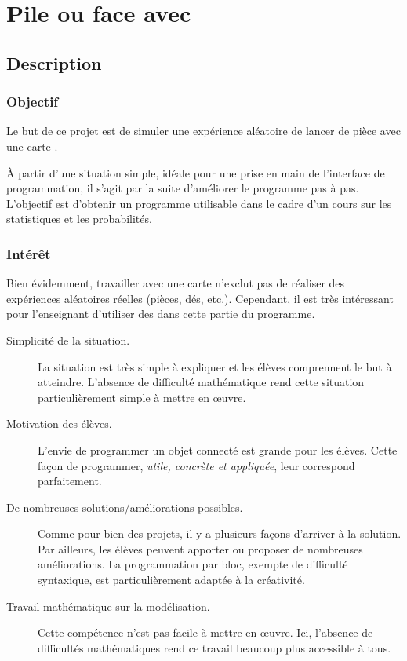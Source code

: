 \section{Pile ou face avec \mb}


\pagestyle{mb}

\subsection{Description}

\subsubsection{Objectif}

\begin{formule}
Le but de ce projet est de simuler une expérience aléatoire de lancer de pièce avec une carte \mb.

À partir d’une situation simple, idéale pour une prise en main de l’interface de programmation, il s’agit par la suite d’améliorer le programme pas à pas. L’objectif est d’obtenir un programme utilisable dans le cadre d’un cours sur les statistiques et les probabilités.
\end{formule}

\subsubsection{Intérêt}
Bien évidemment, travailler avec une carte \mb n'exclut pas de réaliser des expériences aléatoires réelles (pièces, dés, etc.). Cependant, il est très intéressant pour l'enseignant d'utiliser des \mb dans cette partie du programme.
\begin{description}
    \item [Simplicité de la situation.] La situation est très simple à expliquer et les élèves comprennent le but à atteindre. L'absence de difficulté mathématique rend cette situation particulièrement simple à mettre en œuvre.
    \item [Motivation des élèves.] L'envie de programmer un objet connecté est grande pour les élèves. Cette façon de programmer, \emph{utile, concrète et appliquée}, leur correspond parfaitement.
    \item [De nombreuses solutions/améliorations possibles.] Comme pour bien des projets, il y a plusieurs façons d'arriver à la solution. Par ailleurs, les élèves peuvent apporter ou proposer de nombreuses améliorations. La programmation par bloc, exempte de difficulté syntaxique, est particulièrement adaptée à la créativité.
    \item [Travail mathématique sur la modélisation.] Cette compétence n'est pas facile à mettre en œuvre. Ici, l'absence de difficultés mathématiques rend ce travail beaucoup plus accessible à tous.
\end{description}


